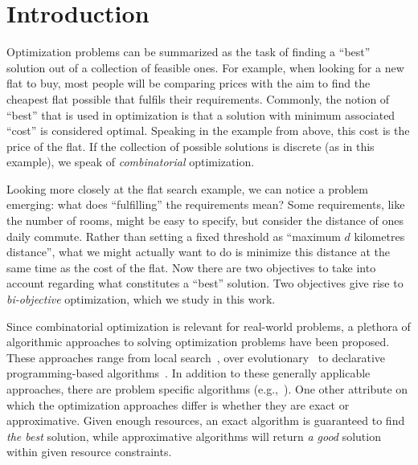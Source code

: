 \chapter{Introduction\label{chap:intro}}

Optimization problems can be summarized as the task of finding a ``best'' solution out of a collection of feasible ones.
For example, when looking for a new flat to buy, most people will be comparing prices with the aim to find the cheapest flat possible that fulfils their requirements.
Commonly, the notion of ``best'' that is used in optimization is that a solution with minimum associated ``cost'' is considered optimal.
Speaking in the example from above, this cost is the price of the flat.
If the collection of possible solutions is discrete (as in this example), we speak of \emph{combinatorial} optimization.

Looking more closely at the flat search example, we can notice a problem emerging:
what does ``fulfilling'' the requirements mean?
Some requirements, like the number of rooms, might be easy to specify, but consider the distance of ones daily commute.
Rather than setting a fixed threshold as ``maximum $d$ kilometres distance'', what we might actually want to do is minimize this distance at the same time as the cost of the flat.
Now there are two objectives to take into account regarding what constitutes a ``best'' solution.
Two objectives give rise to \emph{bi-objective} optimization, which we study in this work.

Since combinatorial optimization is relevant for real-world problems, a plethora of algorithmic approaches to solving optimization problems have been proposed.
These approaches range from local search~\autocite{DBLP:books/daglib/0017492}, over evolutionary~\autocites{DBLP:books/daglib/0087893,DBLP:journals/jgo/StornP97} to declarative programming-based algorithms~\autocite{handbook2-maxsat,ChenEtAl2010-intro,DBLP:reference/fai/2}.
In addition to these generally applicable approaches, there are problem specific algorithms (e.g.,~\autocite{DBLP:conf/aaai/DemirovicS21,DBLP:conf/kdd/NijssenF07,DBLP:conf/nips/HuRS19}).
One other attribute on which the optimization approaches differ is whether they are exact or approximative.
Given enough resources, an exact algorithm is guaranteed to find \emph{the best} solution, while approximative algorithms will return \emph{a good} solution within given resource constraints.

